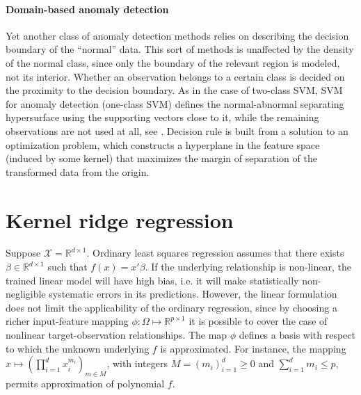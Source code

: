 \documentclass[a4paper,14pt]{extarticle}
\newcommand{\Xcal}{\mathcal{X}}
\newcommand{\Real}{\mathbb{R}}
\begin{document}

\paragraph{Domain-based anomaly detection} %
\label{par:domain_based_anomaly_detection}

Yet another class of anomaly detection methods relies on describing the decision
boundary of the ``normal'' data. This sort of methods is unaffected by the density
of the normal class, since only the boundary of the relevant region is modeled, not
its interior. Whether an observation belongs to a certain class is decided on the
proximity to the decision boundary. As in the case of two-class SVM, SVM for anomaly
detection (one-class SVM) defines the normal-abnormal separating hypersurface using
the supporting vectors close to it, while the remaining observations are not used
at all, see \cite{scholkopf1999,tax1999,manevitz2002}. Decision rule is built from
a solution to an optimization problem, which constructs a hyperplane in the feature
space (induced by some kernel) that maximizes the margin of separation of the transformed
data from the origin.



\section{Kernel ridge regression} %
\label{sec:kernel_ridge_regression}

Suppose $\Xcal = \Real^{d\times 1}$. Ordinary least squares regression assumes that
there exists $\beta\in \Real^{d\times 1}$ such that $f(x) = x'\beta$. If the underlying
relationship is non-linear, the trained linear model will have high bias, i.e.
it will make statistically non-negligible systematic errors in its predictions.
However, the linear formulation does not limit the applicability of the ordinary
regression, since by choosing a richer input-feature mapping $\phi: \Omega \mapsto
\Real^{p\times 1}$ it is possible to cover the case of nonlinear target-observation
relationships. The map $\phi$ defines a basis with respect to which the unknown
underlying $f$ is approximated. For instance, the mapping $x\mapsto (\prod_{i=1}^d
x_i^{m_i})_{m\in M}$, with integers $M=(m_i)_{i=1}^d\geq 0$ and $\sum_{i=1}^d m_i \leq p$,
permits approximation of polynomial $f$.
\end{document}
